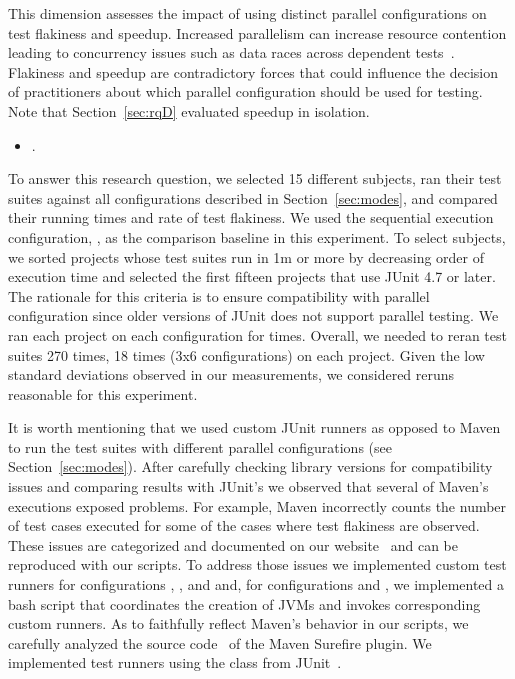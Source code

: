 This dimension assesses the impact of using distinct parallel
configurations on test flakiness and speedup.  Increased parallelism
can increase resource contention leading to concurrency issues such as
data races across dependent
tests~\cite{luo-etal-fse2014,bell-etal-esecfse2015}.  Flakiness and
speedup are contradictory forces that could influence the decision of
practitioners about which parallel configuration should be used for
testing.  Note that Section~\ref{sec:rqD} evaluated speedup in
isolation.

\begin{itemize}
  \item \numRQIssuesOne{}. \textbf{\RQIssuesOne{}}
\end{itemize}



To answer this research question, we selected 15 different subjects,
ran their test suites against all configurations described in
Section~\ref{sec:modes}, and compared their running times and rate of
test flakiness.  We used the sequential execution configuration,
\emph{\Seq{}}, as the comparison baseline in this experiment.  To
select subjects, we sorted projects whose test suites run in 1m or
more by decreasing order of execution time and selected the first
fifteen projects that use JUnit 4.7 or later.  The rationale for this
criteria is to ensure compatibility with parallel configuration since
older versions of JUnit does not support parallel testing.  We ran
each project on each configuration for \SubjectsReruns{} times.
Overall, we needed to reran test suites 270 times, 18 times (3x6
configurations) on each project.  Given the low standard deviations
observed in our measurements, we considered \SubjectsReruns{} reruns reasonable for this
experiment.

It is worth mentioning that we used custom JUnit runners as opposed to
Maven to run the test suites with different parallel configurations
(see Section~\ref{sec:modes}).  After carefully checking library
versions for compatibility issues and comparing results with JUnit's
we observed that several of Maven's executions exposed problems.  For
example, Maven incorrectly counts the number of test cases executed
for some of the cases where test flakiness are observed. These issues are
categorized and documented on our website~\cite{ourwebpage} and can be
reproduced with our scripts.  To address those issues we implemented
custom test runners for configurations \emph{\SeqClassParMeth{}},
\emph{\ParClassSeqMeth{}}, and \emph{\ParClassParMeth{}} and,  for configurations
\emph{\ForkSeq{}} and \emph{\ForkParMeth{}}, we
implemented a bash script that coordinates the creation of JVMs and
invokes corresponding custom runners.  As to faithfully reflect
Maven's behavior in our scripts, we carefully analyzed the source
code~\cite{maven-surefire-source} of the Maven Surefire plugin. We
implemented test runners using the  class from
JUnit~\cite{junit-parallel}.  

